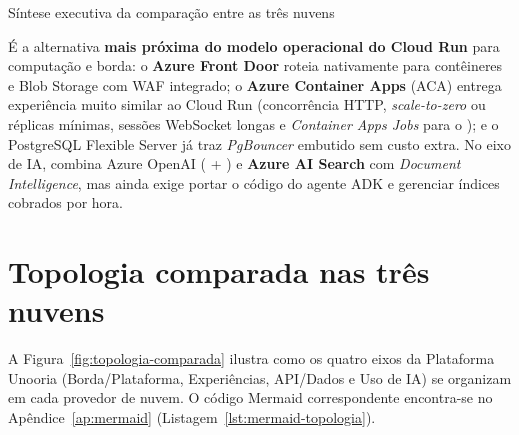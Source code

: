 \begin{fichaeixo}{Síntese executiva da comparação entre as três nuvens}
\begin{campos}
  \item[Azure] \equivalente\enspace É a alternativa \textbf{mais próxima do
    modelo operacional do Cloud Run} para computação e borda: o \textbf{Azure
    Front Door} roteia nativamente para contêineres e Blob Storage com WAF
    integrado; o \textbf{Azure Container Apps} (ACA) entrega experiência muito
    similar ao Cloud Run (concorrência HTTP, \emph{scale-to-zero} ou réplicas
    mínimas, sessões WebSocket longas e \emph{Container Apps Jobs} para o
    ); e o PostgreSQL Flexible Server já traz
    \emph{PgBouncer} embutido sem custo extra. No eixo de IA, combina Azure
    OpenAI ( + ) e \textbf{Azure AI Search} com
    \emph{Document Intelligence}, mas ainda exige portar o código do agente ADK
    e gerenciar índices cobrados por hora.
\end{campos}
\end{fichaeixo}

\section{Topologia comparada nas três nuvens}

A Figura~\ref{fig:topologia-comparada} ilustra como os quatro eixos da
Plataforma Unooria (Borda/Plataforma, Experiências, API/Dados e Uso de IA) se
organizam em cada provedor de nuvem. O código Mermaid correspondente encontra-se
no Apêndice~\ref{ap:mermaid} (Listagem~\ref{lst:mermaid-topologia}).

